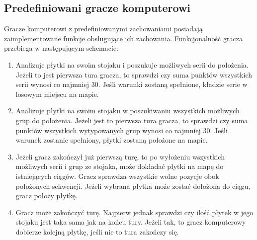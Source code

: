 \documentclass[a4paper,twoside,12pt]{book}
\begin{document}
	\subsection{Predefiniowani gracze komputerowi}
	Gracze komputerowi z predefiniowanymi zachowaniami posiadają zaimplementowane funkcje obsługujące ich zachowania. Funkcjonalność gracza przebiega w następującym schemacie:
	\begin{enumerate}
		\item Analizuje płytki na swoim stojaku i poszukuje możliwych serii do położenia. Jeżeli to jest pierwsza tura gracza, to sprawdzi czy suma punktów wszystkich serii wynosi co najmniej 30. Jeśli warunki zostaną spełnione, kładzie serie w losowym miejscu na mapie.
		\item Analizuje płytki na swoim stojaku w poszukiwaniu wszystkich możliwych grup do położenia. Jeżeli jest to pierwsza tura gracza, to sprawdzi czy suma punktów wszystkich wytypowanych grup wynosi co najmniej 30. Jeśli warunek zostanie spełniony, płytki zostaną położone na mapie.
		\item Jeżeli gracz zakończył już pierwszą turę, to po wyłożeniu wszystkich możliwych serii i grup ze stojaka, może dokładać płytki na mapę do istniejących ciągów. Gracz sprawdza wszystkie wolne pozycje obok położonych sekwencji. Jeżeli wybrana płytka może zostać dołożona do ciągu, gracz położy płytkę.
		\item Gracz może zakończyć turę. Najpierw jednak sprawdzi czy ilość płytek w jego stojaku jest taka sama jak na końcu tury. Jeżeli tak, to gracz komputerowy dobierze kolejną płytkę, jeśli nie to tura zakończy się. 
	\end{enumerate}
\end{document}
